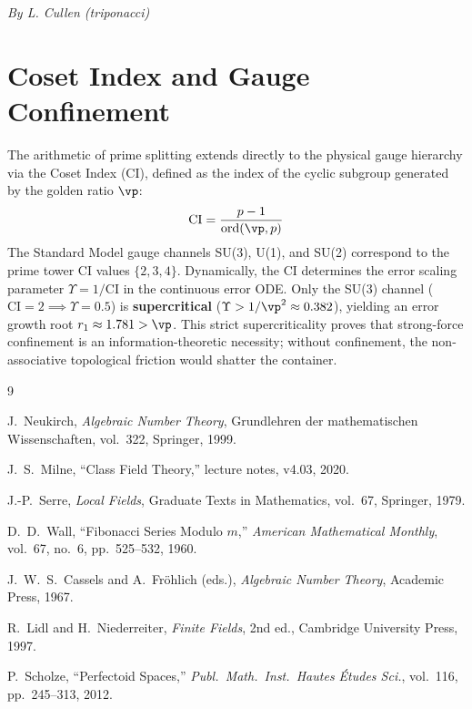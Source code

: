 \begin{center}\textit{By L. Cullen (triponacci)}\end{center}


\section*{Coset Index and Gauge Confinement}

The arithmetic of prime splitting extends directly to the physical gauge hierarchy via the Coset Index (CI), defined as the index of the cyclic subgroup generated by the golden ratio $\vp$:
\begin{equation}
\mathrm{CI} = \frac{p-1}{\mathrm{ord}(\vp, p)}
\end{equation}
The Standard Model gauge channels SU(3), U(1), and SU(2) correspond to the prime tower CI values $\{2, 3, 4\}$. Dynamically, the CI determines the error scaling parameter $\Upsilon = 1/\mathrm{CI}$ in the continuous error ODE. Only the SU(3) channel ($\mathrm{CI} = 2 \implies \Upsilon = 0.5$) is \textbf{supercritical} ($\Upsilon > 1/\vp^2 \approx 0.382$), yielding an error growth root $r_1 \approx 1.781 > \vp$. This strict supercriticality proves that strong-force confinement is an information-theoretic necessity; without confinement, the non-associative topological friction would shatter the container.

\begin{thebibliography}{9}

J.~Neukirch,
\emph{Algebraic Number Theory},
Grundlehren der mathematischen Wissenschaften, vol.~322, Springer, 1999.

J.~S.~Milne,
``Class Field Theory,''
lecture notes, v4.03, 2020.

J.-P.~Serre,
\emph{Local Fields},
Graduate Texts in Mathematics, vol.~67, Springer, 1979.

D.~D.~Wall,
``Fibonacci Series Modulo $m$,''
\textit{American Mathematical Monthly}, vol.~67, no.~6, pp.~525--532, 1960.

J.~W.~S.~Cassels and A.~Fr\"ohlich (eds.),
\emph{Algebraic Number Theory},
Academic Press, 1967.

R.~Lidl and H.~Niederreiter,
\emph{Finite Fields}, 2nd ed.,
Cambridge University Press, 1997.

P.~Scholze,
``Perfectoid Spaces,''
\textit{Publ.\ Math.\ Inst.\ Hautes \'Etudes Sci.}, vol.~116, pp.~245--313, 2012.

\end{thebibliography}

